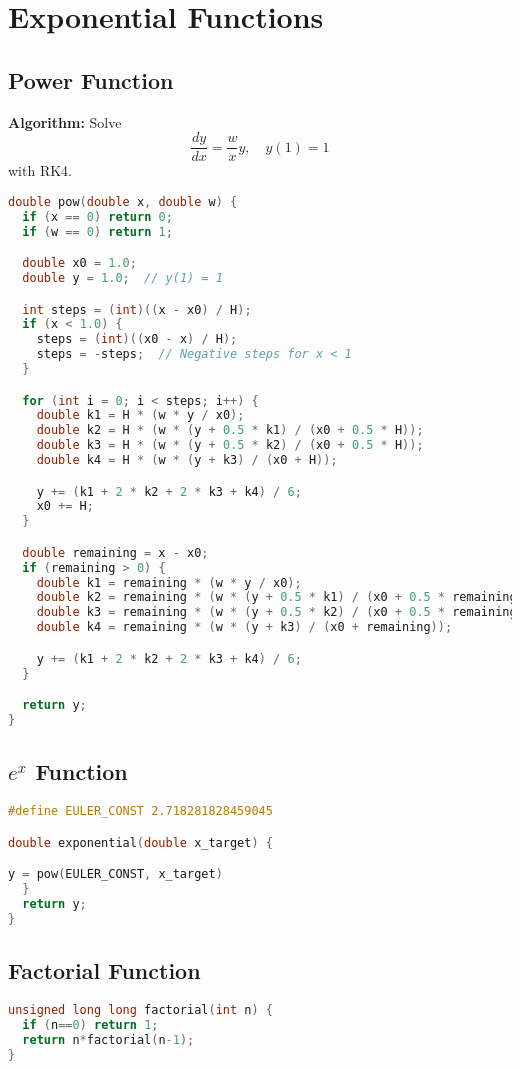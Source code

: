 \documentclass[conference]{IEEEtran}
\begin{document}
\section{Exponential Functions}

\subsection{Power Function}
\textbf{Algorithm:} Solve 
\[
\frac{dy}{dx} = \frac{w}{x} y, \quad y(1)=1
\]
with RK4.

\begin{lstlisting}[language=C, caption={Power Function Implementation}]
double pow(double x, double w) {
  if (x == 0) return 0;  
  if (w == 0) return 1;  

  double x0 = 1.0;
  double y = 1.0;  // y(1) = 1

  int steps = (int)((x - x0) / H);
  if (x < 1.0) {
    steps = (int)((x0 - x) / H);
    steps = -steps;  // Negative steps for x < 1
  }

  for (int i = 0; i < steps; i++) {
    double k1 = H * (w * y / x0);
    double k2 = H * (w * (y + 0.5 * k1) / (x0 + 0.5 * H));
    double k3 = H * (w * (y + 0.5 * k2) / (x0 + 0.5 * H));
    double k4 = H * (w * (y + k3) / (x0 + H));

    y += (k1 + 2 * k2 + 2 * k3 + k4) / 6;
    x0 += H;
  }

  double remaining = x - x0;
  if (remaining > 0) {
    double k1 = remaining * (w * y / x0);
    double k2 = remaining * (w * (y + 0.5 * k1) / (x0 + 0.5 * remaining));
    double k3 = remaining * (w * (y + 0.5 * k2) / (x0 + 0.5 * remaining));
    double k4 = remaining * (w * (y + k3) / (x0 + remaining));

    y += (k1 + 2 * k2 + 2 * k3 + k4) / 6;
  }

  return y;
}
\end{lstlisting}
\subsection{$e^x$ Function}
\begin{lstlisting}[language=C, caption={C Implementation of Exponential Function}]
#define EULER_CONST 2.718281828459045

double exponential(double x_target) {

y = pow(EULER_CONST, x_target)
  }
  return y;
}
\end{lstlisting}
\subsection{Factorial Function}
\begin{lstlisting}[language=C, caption={C Implementation of Factorial Function}]
unsigned long long factorial(int n) {
  if (n==0) return 1;
  return n*factorial(n-1);
}
\end{lstlisting}
\end{document}
